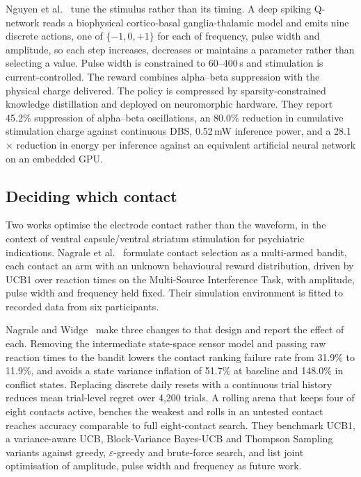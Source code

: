 Nguyen et al.~\cite{nguyen2026neuromorphic} tune the stimulus rather than its
timing. A deep spiking Q-network reads a biophysical cortico-basal
ganglia-thalamic model and emits nine discrete actions, one of
$\{-1, 0, +1\}$ for each of frequency, pulse width and amplitude, so each step
increases, decreases or maintains a parameter rather than selecting a value.
Pulse width is constrained to 60--400\,\textmu s and stimulation is
current-controlled. The reward combines alpha--beta suppression with the
physical charge delivered. The policy is compressed by sparsity-constrained
knowledge distillation and deployed on neuromorphic hardware. They report
45.2\% suppression of alpha--beta oscillations, an 80.0\% reduction in
cumulative stimulation charge against continuous DBS, 0.52\,mW inference
power, and a 28.1$\times$ reduction in energy per inference against an
equivalent artificial neural network on an embedded GPU.


\subsection*{Deciding which contact}

Two works optimise the electrode contact rather than the waveform, in the
context of ventral capsule/ventral striatum stimulation for psychiatric
indications. Nagrale et al.~\cite{nagrale2023bayesian} formulate contact
selection as a multi-armed bandit, each contact an arm with an unknown
behavioural reward distribution, driven by UCB1 over reaction times on the
Multi-Source Interference Task, with amplitude, pulse width and frequency held
fixed. Their simulation environment is fitted to recorded data from six
participants.

Nagrale and Widge~\cite{nagrale2026arena} make three changes to that design
and report the effect of each. Removing the intermediate state-space sensor
model and passing raw reaction times to the bandit lowers the contact ranking
failure rate from 31.9\% to 11.9\%, and avoids a state variance inflation of
51.7\% at baseline and 148.0\% in conflict states. Replacing discrete daily
resets with a continuous trial history reduces mean trial-level regret over
4{,}200 trials. A rolling arena that keeps four of eight contacts active,
benches the weakest and rolls in an untested contact reaches accuracy
comparable to full eight-contact search. They benchmark UCB1, a variance-aware
UCB, Block-Variance Bayes-UCB and Thompson Sampling variants against greedy,
$\varepsilon$-greedy and brute-force search, and list joint optimisation of
amplitude, pulse width and frequency as future work.


